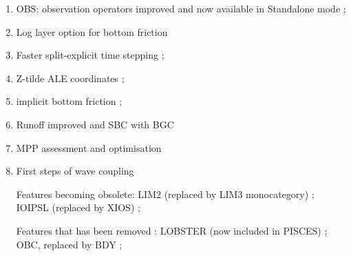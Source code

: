 \documentclass[NEMO_book]{subfiles}
\begin{document}
\begin{enumerate}
\item OBS: observation operators improved and now available in Standalone mode ;
\item Log layer option for bottom friction
\item Faster split-explicit time stepping ; 
\item Z-tilde ALE coordinates \citep{Leclair_Madec_OM11} ; 
\item implicit bottom friction ;
\item Runoff improved and SBC with BGC
\item MPP assessment and optimisation
\item First steps of wave coupling

Features becoming obsolete: LIM2 (replaced by LIM3 monocategory) ; IOIPSL (replaced by XIOS) ; 

Features that has been removed : LOBSTER (now included in PISCES) ; OBC, replaced by BDY ;   



\end{enumerate}
\end{document}
